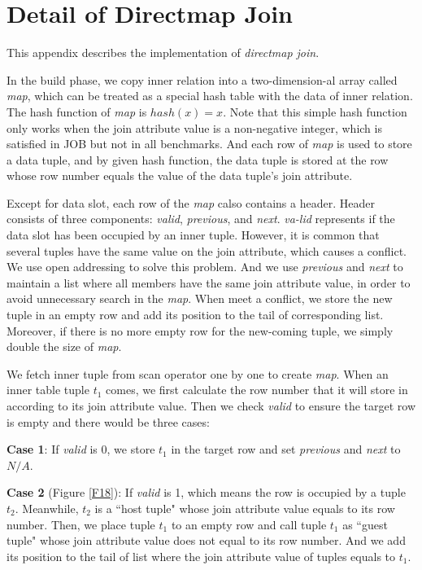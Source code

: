\section{Detail of Directmap Join}
    This appendix describes the implementation of \textit{directmap join}.\par
    In the build phase, we copy inner relation into a two-dimension-al array called \textit{map}, which can be treated as a special hash table with the data of inner relation. The hash function of \textit{map} is $hash(x)=x$. Note that this simple hash function only works when the join attribute value is a non-negative integer, which is satisfied in JOB but not in all benchmarks. And each row of \textit{map} is used to store a data tuple, and by given hash function, the data tuple is stored at the row whose row number equals the value of the data tuple's join attribute.\par
    Except for data slot, each row of the \textit{map} calso contains a header. Header consists of three components: \textit{valid}, \textit{previous}, and \textit{next}. \textit{va-lid} represents if the data slot has been occupied by an inner tuple. However, it is common that several tuples have the same value on the join attribute, which causes a conflict. We use open addressing \cite{book2} to solve this problem. And we use \textit{previous} and \textit{next} to maintain a list where all members have the same join attribute value, in order to avoid unnecessary search in the \textit{map}. When meet a conflict, we store the new tuple in an empty row and add its position to the tail of corresponding list. Moreover, if there is no more empty row for the new-coming tuple, we simply double the size of \textit{map}.\par
    We fetch inner tuple from scan operator one by one to create \textit{map}. When an inner table tuple $t_1$ comes, we first calculate the row number that it will store in according to its join attribute value. Then we check \textit{valid} to ensure the target row is empty and there would be three cases:\par
    \textbf{Case 1}: If \textit{valid} is 0, we store $t_1$ in the target row and set \textit{previous} and \textit{next} to $N/A$.\par
    \textbf{Case 2} (Figure \ref{F18}): If \textit{valid} is 1, which means the row is occupied by a tuple $t_2$. Meanwhile, $t_2$ is a ``host tuple" whose join attribute value equals to its row number. Then, we place tuple $t_1$ to an empty row and call tuple $t_1$ as ``guest tuple" whose join attribute value does not equal to its row number. And we add its position to the tail of list where the join attribute value of tuples equals to $t_1$.

